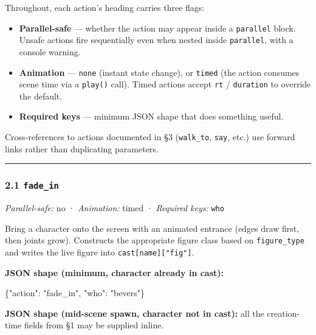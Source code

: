 \documentclass[
  11pt,
]{book}
\newenvironment{Shaded}{}{}
\newcommand{\DataTypeTok}[1]{\textcolor[rgb]{0.56,0.13,0.00}{#1}}
\newcommand{\FunctionTok}[1]{\textcolor[rgb]{0.02,0.16,0.49}{#1}}
\newcommand{\StringTok}[1]{\textcolor[rgb]{0.25,0.44,0.63}{#1}}
\providecommand{\tightlist}{%
  \setlength{\itemsep}{0pt}\setlength{\parskip}{0pt}}
\begin{document}
Throughout, each action's heading carries three flags:

\begin{itemize}
\tightlist
\item
  \textbf{Parallel-safe} --- whether the action may appear inside a
  \texttt{parallel} block. Unsafe actions fire sequentially even when
  nested inside \texttt{parallel}, with a console warning.
\item
  \textbf{Animation} --- \texttt{none} (instant state change), or
  \texttt{timed} (the action consumes scene time via a \texttt{play()}
  call). Timed actions accept \texttt{rt} / \texttt{duration} to
  override the default.
\item
  \textbf{Required keys} --- minimum JSON shape that does something
  useful.
\end{itemize}

Cross-references to actions documented in §3 (\texttt{walk\_to},
\texttt{say}, etc.) use forward links rather than duplicating
parameters.

\begin{center}\rule{0.5\linewidth}{0.5pt}\end{center}

\subsubsection{\texorpdfstring{2.1
\texttt{fade\_in}}{2.1 fade\_in}}\label{fade_in}

\emph{Parallel-safe:} no · \emph{Animation:} timed · \emph{Required
keys:} \texttt{who}

Bring a character onto the screen with an animated entrance (edges draw
first, then joints grow). Constructs the appropriate figure class based
on \texttt{figure\_type} and writes the live figure into
\texttt{cast{[}name{]}{[}"fig"{]}}.

\textbf{JSON shape (minimum, character already in cast):}

\begin{Shaded}
\begin{Highlighting}[]
\FunctionTok{\{}\DataTypeTok{"action"}\FunctionTok{:} \StringTok{"fade\_in"}\FunctionTok{,} \DataTypeTok{"who"}\FunctionTok{:} \StringTok{"bevers"}\FunctionTok{\}}
\end{Highlighting}
\end{Shaded}

\textbf{JSON shape (mid-scene spawn, character not in cast):} all the
creation-time fields from §1 may be supplied inline.
\end{document}
